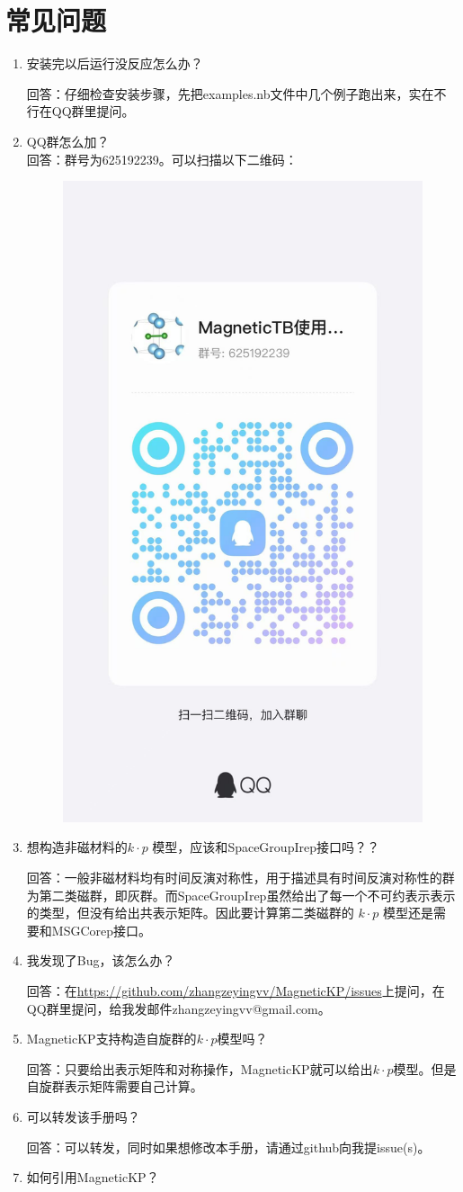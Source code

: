 \documentclass[titlepage,a4paper,12pt,AutoFakeBold]{article}
\newcommand\litem[1]{\item{ #1？\\}}
\begin{document}
\section{常见问题}
    \begin{enumerate}[style=nextline]
    \setlength\itemsep{1.5em}
	\litem{安装完以后运行没反应怎么办} 
	
	回答：仔细检查安装步骤，先把examples.nb文件中几个例子跑出来，实在不行在QQ群里提问。

	\litem{QQ群怎么加} 
	回答：群号为625192239。可以扫描以下二维码：

\begin{figure}[H]
	\centering
	\includegraphics[width=.3\textwidth]{./figures/QQ}
\end{figure}

	\litem{想构造非磁材料的$k\cdot p$ 模型，应该和\textsf{SpaceGroupIrep}接口吗？} 
	
	回答：一般非磁材料均有时间反演对称性，用于描述具有时间反演对称性的群为第二类磁群，即灰群。而\textsf{SpaceGroupIrep}虽然给出了每一个不可约表示表示的类型，但没有给出共表示矩阵。因此要计算第二类磁群的 $k\cdot p$ 模型还是需要和\textsf{MSGCorep}接口。
	
	\litem{我发现了Bug，该怎么办}
	
	回答：在\url{https://github.com/zhangzeyingvv/MagneticKP/issues}上提问，在QQ群里提问，给我发邮件zhangzeyingvv@gmail.com。
		
	
	\litem{\textsf{MagneticKP}支持构造自旋群的$k\cdot p$模型吗}

	回答：只要给出表示矩阵和对称操作，\textsf{MagneticKP}就可以给出$k\cdot p$模型。但是自旋群表示矩阵需要自己计算。
		
	\litem{可以转发该手册吗}

	回答：可以转发，同时如果想修改本手册，请通过github向我提issue(s)。

	\litem{如何引用\textsf{MagneticKP}}


\end{enumerate}
\end{document}
